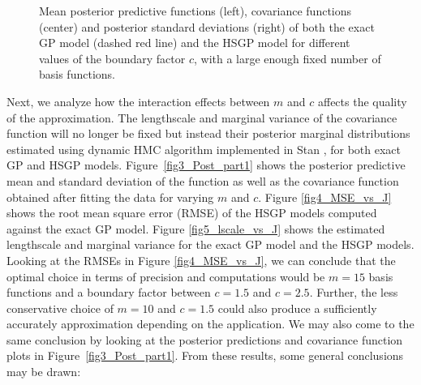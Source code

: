 \documentclass[onecolumn,a4paper,11pt]{article}
\begin{document}
\begin{figure}
\caption{Mean posterior predictive functions (left), covariance functions (center) and posterior standard deviations (right) of both the exact GP model (dashed red line) and the HSGP model for different values of the boundary factor $c$, with a large enough fixed number of basis functions.}
  \label{fig2_Post_L}
\end{figure}


Next, we analyze how the interaction effects between $m$ and $c$ affects the quality of the approximation. The lengthscale and marginal variance of the covariance function will no longer be fixed but instead their posterior marginal distributions estimated using dynamic HMC algorithm implemented in Stan \citep{carpenter2017stan,betancourt2017conceptual}, for both exact GP and HSGP models. Figure~\ref{fig3_Post_part1} shows the posterior predictive mean and standard deviation of the function as well as the covariance function obtained after fitting the data for varying $m$ and $c$. Figure \ref{fig4_MSE_vs_J} shows the root mean square error (RMSE) of the HSGP models computed against the exact GP model. Figure \ref{fig5_lscale_vs_J} shows the estimated lengthscale and marginal variance for the exact GP model and the HSGP models. Looking at the RMSEs in Figure \ref{fig4_MSE_vs_J}, we can conclude that the optimal choice in terms of precision and computations would be $m = 15$ basis functions and a boundary factor between $c = 1.5$ and $c = 2.5$. Further, the less conservative choice of $m = 10$ and $c = 1.5$  could also produce a sufficiently accurately approximation depending on the application. We may also come to the same conclusion by looking at the posterior predictions and covariance function plots in Figure~\ref{fig3_Post_part1}. From these results, some general conclusions may be drawn:
\end{document}
